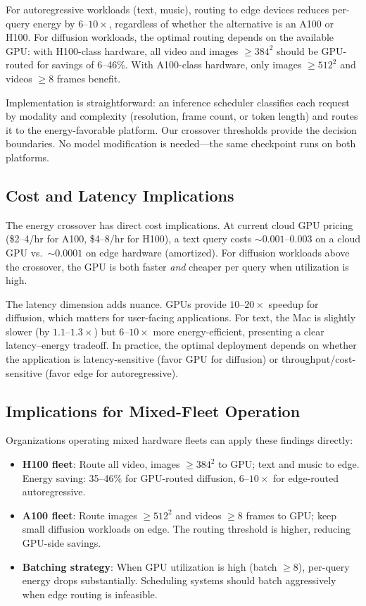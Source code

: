 \documentclass[acmlarge,manuscript,screen,review]{acmart}
\begin{document}
For autoregressive workloads (text, music), routing to edge devices reduces per-query energy by $6$--$10\times$, regardless of whether the alternative is an A100 or H100. For diffusion workloads, the optimal routing depends on the available GPU: with H100-class hardware, all video and images $\geq 384^2$ should be GPU-routed for savings of 6--46\%. With A100-class hardware, only images $\geq 512^2$ and videos $\geq 8$ frames benefit.

Implementation is straightforward: an inference scheduler classifies each request by modality and complexity (resolution, frame count, or token length) and routes it to the energy-favorable platform. Our crossover thresholds provide the decision boundaries. No model modification is needed---the same checkpoint runs on both platforms.

\subsection{Cost and Latency Implications}

The energy crossover has direct cost implications. At current cloud GPU pricing (\$2--4/hr for A100, \$4--8/hr for H100), a text query costs ${\sim}0.001$--$0.003$ on a cloud GPU vs.\ ${\sim}0.0001$ on edge hardware (amortized). For diffusion workloads above the crossover, the GPU is both faster \emph{and} cheaper per query when utilization is high.

The latency dimension adds nuance. GPUs provide $10$--$20\times$ speedup for diffusion, which matters for user-facing applications. For text, the Mac is slightly slower (by $1.1$--$1.3\times$) but $6$--$10\times$ more energy-efficient, presenting a clear latency--energy tradeoff. In practice, the optimal deployment depends on whether the application is latency-sensitive (favor GPU for diffusion) or throughput/cost-sensitive (favor edge for autoregressive).

\subsection{Implications for Mixed-Fleet Operation}

Organizations operating mixed hardware fleets can apply these findings directly:

\begin{itemize}[leftmargin=*]
\item \textbf{H100 fleet}: Route all video, images $\geq 384^2$ to GPU; text and music to edge. Energy saving: 35--46\% for GPU-routed diffusion, $6$--$10\times$ for edge-routed autoregressive.
\item \textbf{A100 fleet}: Route images $\geq 512^2$ and videos $\geq 8$ frames to GPU; keep small diffusion workloads on edge. The routing threshold is higher, reducing GPU-side savings.
\item \textbf{Batching strategy}: When GPU utilization is high (batch $\geq 8$), per-query energy drops substantially. Scheduling systems should batch aggressively when edge routing is infeasible.
\end{itemize}
\end{document}

